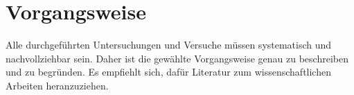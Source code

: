 

\section{Vorgangsweise} \label{sec:Vorgangsweise}
Alle durchgeführten Untersuchungen und Versuche müssen systematisch und nachvollziehbar sein. Daher ist die gewählte Vorgangsweise genau zu beschreiben und zu begründen. Es empfiehlt sich, dafür Literatur zum wissenschaftlichen Arbeiten heranzuziehen.



